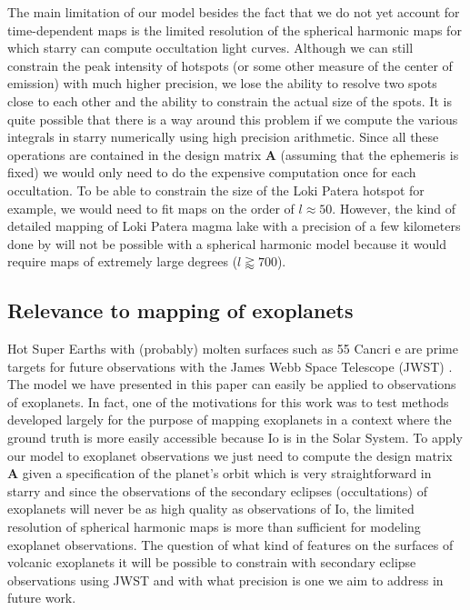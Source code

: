 \documentclass[linenumbers,modern]{aastex62}
\begin{document}
The main limitation of our model besides the fact that we do not yet account for time-dependent maps is the limited resolution of the spherical harmonic maps for which \textsf{starry} can compute occultation light curves.
Although we can still constrain the peak intensity of hotspots (or some other measure of the center of emission) with much higher precision, we lose the ability to resolve two spots close to each other and the ability to constrain the actual size of the spots. 
It is quite possible that there is a way around this problem if we compute the various integrals in \textsf{starry} numerically using high precision arithmetic.
Since all these operations are contained in the design matrix $\mathbf{A}$ (assuming that the ephemeris is fixed) we would only need to do the expensive computation once for each occultation.
To be able to constrain the size of the Loki Patera hotspot for example, we would need to fit maps on the order of $l\approx 50$.
However, the kind of detailed mapping of Loki Patera magma lake with a precision of a few kilometers done by \cite{dekleer2017} will not be possible with a spherical harmonic model because it would require maps of extremely large degrees ($l\gtrapprox 700$).

\subsection{Relevance to mapping of exoplanets} 
\label{ssec:discussion_exoplanets}
Hot Super Earths with (probably) molten surfaces such as 55 Cancri e are prime targets for future observations with the James Webb Space Telescope (JWST) \citep{samuel2014,henning2018}.
The model we have presented in this paper can easily be applied to observations of exoplanets. 
In fact, one of the motivations for this work was to test methods developed largely for the purpose of mapping exoplanets in a context where the ground truth is more easily accessible because Io is in the Solar System.
To apply our model to exoplanet observations we just need to compute the design matrix $\mathbf{A}$ given a specification of the planet's orbit which is very straightforward in \textsf{starry}
and since the observations of the secondary eclipses (occultations) of exoplanets will never be as high quality as observations of Io, the limited resolution of spherical harmonic maps is more than sufficient for modeling exoplanet observations.
The question of what kind of features on the surfaces of volcanic exoplanets it will be possible to constrain with secondary eclipse observations using JWST and with what precision is one we aim to address in future work.
\end{document}

